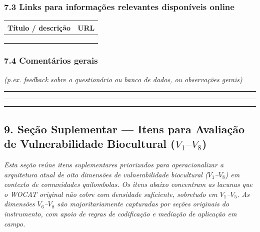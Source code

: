 \subsubsection{7.3 Links para informações relevantes disponíveis online}\label{links-para-informauxe7uxf5es-relevantes-disponuxedveis-online}

{
\begin{longtable}[]{@{}ll@{}}
\toprule\noalign{}
Título / descrição & URL \\
\midrule\noalign{}
\endhead
\bottomrule\noalign{}
\endlastfoot
& \\
& \\
& \\
\end{longtable}
}

\subsubsection{7.4 Comentários gerais}\label{comentuxe1rios-gerais}

\emph{(p.ex. feedback sobre o questionário ou banco de dados, ou observações gerais)}

\begin{center}\rule{0.5\linewidth}{0.5pt}\end{center}

\begin{center}\rule{0.5\linewidth}{0.5pt}\end{center}

\newpage

\begin{center}\rule{0.5\linewidth}{0.5pt}\end{center}

\subsection{9. Seção Suplementar --- Itens para Avaliação de Vulnerabilidade Biocultural ($V_1$--$V_8$)}\label{secao-suplementar-v1v8}

\emph{Esta seção reúne itens suplementares priorizados para operacionalizar a arquitetura atual de oito dimensões de vulnerabilidade biocultural ($V_1$--$V_8$) em contexto de comunidades quilombolas. Os itens abaixo concentram as lacunas que o WOCAT original não cobre com densidade suficiente, sobretudo em $V_1$--$V_5$. As dimensões $V_6$--$V_8$ são majoritariamente capturadas por seções originais do instrumento, com apoio de regras de codificação e mediação de aplicação em campo.}


